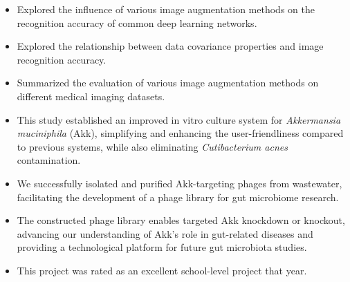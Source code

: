 \documentclass{resume}
\begin{document}
    \begin{itemize}
      \item Explored the influence of various image augmentation methods on the recognition accuracy of common deep learning networks.
      \item Explored the relationship between data covariance properties and image recognition accuracy.
      \item Summarized the evaluation of various image augmentation methods on different medical imaging datasets.
    \end{itemize}

  \begin{itemize}
    \item This study established an improved in vitro culture system for \textit{Akkermansia muciniphila} (Akk), simplifying and enhancing the user-friendliness compared to previous systems, while also eliminating \textit{Cutibacterium acnes} contamination.
    \item We successfully isolated and purified Akk-targeting phages from wastewater, facilitating the development of a phage library for gut microbiome research.
    \item The constructed phage library enables targeted Akk knockdown or knockout, advancing our understanding of Akk's role in gut-related diseases and providing a technological platform for future gut microbiota studies.
    \item This project was rated as an excellent school-level project that year.
  \end{itemize}

\end{document}

